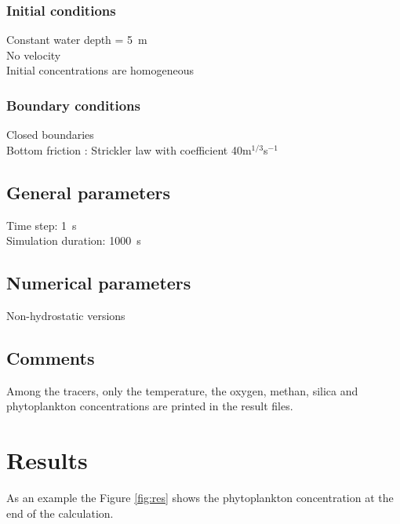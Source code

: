\subsubsection{Initial conditions}
%
Constant water depth = 5~m\\
No velocity\\
Initial concentrations are homogeneous
%
\subsubsection{Boundary conditions}
%
Closed boundaries\\
Bottom friction : Strickler law with coefficient 40m$^{1/3}$s$^{-1}$
%
\subsection{General parameters}
%
Time step: 1~s\\
Simulation duration: 1000~s
%
%
%
\subsection{Numerical parameters}
%
Non-hydrostatic versions\\
%

%
\subsection{Comments}
Among the tracers, only the temperature, the oxygen, methan, silica and phytoplankton concentrations are printed in the result files.

%
%
\section{Results}

As an example the Figure \ref{fig:res} shows the phytoplankton concentration at the end of the calculation.
%

